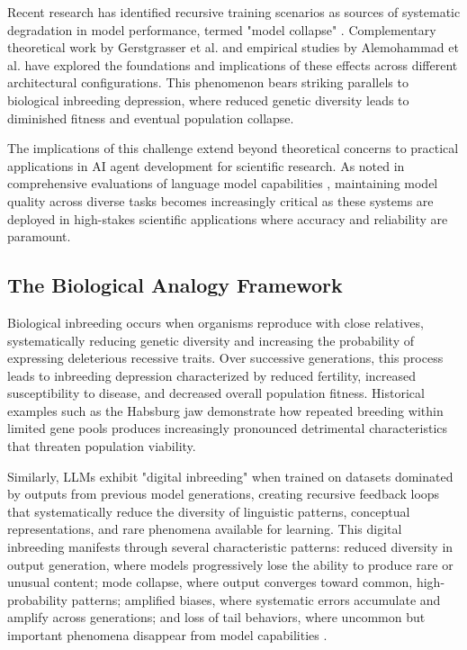\documentclass{article}
\begin{document}
Recent research has identified recursive training scenarios as sources of systematic degradation in model performance, termed "model collapse" \cite{shumailov2023curse}. Complementary theoretical work by Gerstgrasser et al. \cite{gerstgrasser2024model} and empirical studies by Alemohammad et al. \cite{alemohammad2023self} have explored the foundations and implications of these effects across different architectural configurations. This phenomenon bears striking parallels to biological inbreeding depression, where reduced genetic diversity leads to diminished fitness and eventual population collapse.

The implications of this challenge extend beyond theoretical concerns to practical applications in AI agent development for scientific research. As noted in comprehensive evaluations of language model capabilities \cite{liang2022holistic, srivastava2022beyond}, maintaining model quality across diverse tasks becomes increasingly critical as these systems are deployed in high-stakes scientific applications where accuracy and reliability are paramount.

\subsection{The Biological Analogy Framework}

Biological inbreeding occurs when organisms reproduce with close relatives, systematically reducing genetic diversity and increasing the probability of expressing deleterious recessive traits. Over successive generations, this process leads to inbreeding depression characterized by reduced fertility, increased susceptibility to disease, and decreased overall population fitness. Historical examples such as the Habsburg jaw demonstrate how repeated breeding within limited gene pools produces increasingly pronounced detrimental characteristics that threaten population viability.

Similarly, LLMs exhibit "digital inbreeding" when trained on datasets dominated by outputs from previous model generations, creating recursive feedback loops that systematically reduce the diversity of linguistic patterns, conceptual representations, and rare phenomena available for learning. This digital inbreeding manifests through several characteristic patterns: reduced diversity in output generation, where models progressively lose the ability to produce rare or unusual content; mode collapse, where output converges toward common, high-probability patterns; amplified biases, where systematic errors accumulate and amplify across generations; and loss of tail behaviors, where uncommon but important phenomena disappear from model capabilities \cite{seddik2024bad}.
\end{document}
